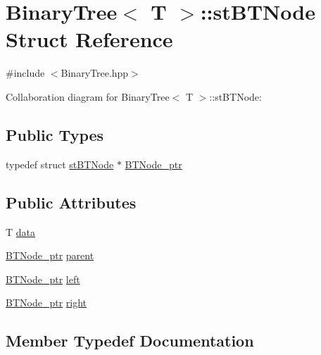 \hypertarget{struct_binary_tree_1_1st_b_t_node}{}\section{Binary\+Tree$<$ T $>$\+:\+:st\+B\+T\+Node Struct Reference}
\label{struct_binary_tree_1_1st_b_t_node}


{\ttfamily \#include $<$Binary\+Tree.\+hpp$>$}



Collaboration diagram for Binary\+Tree$<$ T $>$\+:\+:st\+B\+T\+Node\+:
\subsection*{Public Types}
\begin{DoxyCompactItemize}
\item 
typedef struct \hyperlink{struct_binary_tree_1_1st_b_t_node}{st\+B\+T\+Node} $\ast$ \hyperlink{struct_binary_tree_1_1st_b_t_node_a33f8df7b779a039664f5b5abc92c134f}{B\+T\+Node\+\_\+ptr}
\end{DoxyCompactItemize}
\subsection*{Public Attributes}
\begin{DoxyCompactItemize}
\item 
T \hyperlink{struct_binary_tree_1_1st_b_t_node_ab20fac952b000efe0adaeb60277cf572}{data}
\item 
\hyperlink{struct_binary_tree_1_1st_b_t_node_a33f8df7b779a039664f5b5abc92c134f}{B\+T\+Node\+\_\+ptr} \hyperlink{struct_binary_tree_1_1st_b_t_node_a9df117a2125417974d206c8afa9b67b7}{parent}
\item 
\hyperlink{struct_binary_tree_1_1st_b_t_node_a33f8df7b779a039664f5b5abc92c134f}{B\+T\+Node\+\_\+ptr} \hyperlink{struct_binary_tree_1_1st_b_t_node_af6721dfa7f77e2747996469aea4581d7}{left}
\item 
\hyperlink{struct_binary_tree_1_1st_b_t_node_a33f8df7b779a039664f5b5abc92c134f}{B\+T\+Node\+\_\+ptr} \hyperlink{struct_binary_tree_1_1st_b_t_node_afda002d3e6698e446a536f9224165c25}{right}
\end{DoxyCompactItemize}


\subsection{Member Typedef Documentation}
\mbox{\label{struct_binary_tree_1_1st_b_t_node_a33f8df7b779a039664f5b5abc92c134f}} 
